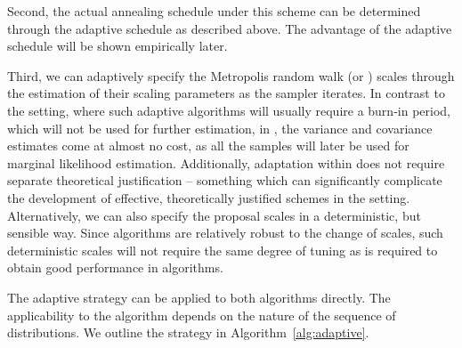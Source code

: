 Second, the actual annealing schedule under this scheme can be determined
through the adaptive schedule as described above. The advantage of the
adaptive schedule will be shown empirically later.

Third, we can adaptively specify the Metropolis random walk (or \mala) scales
through the estimation of their scaling parameters as the sampler iterates. In
contrast to the \mcmc setting, where such adaptive algorithms will usually
require a burn-in period, which will not be used for further estimation, in
\smc, the variance and covariance estimates come at almost no cost, as all the
samples will later be used for marginal likelihood estimation. Additionally,
adaptation within \smc does not require separate theoretical justification
\cite{Beskos:2013vx} -- something which can significantly complicate the
development of effective, theoretically justified schemes in the \mcmc
setting. Alternatively, we can also specify the proposal scales in a
deterministic, but sensible way. Since \smc algorithms are relatively robust
to the change of scales, such deterministic scales will not require the same
degree of tuning as is required to obtain good performance in \mcmc
algorithms.

The adaptive strategy can be applied to both algorithms directly. The
applicability to the \smc[3] algorithm depends on the nature of the sequence
of distributions. We outline the strategy in Algorithm~\ref{alg:adaptive}.


